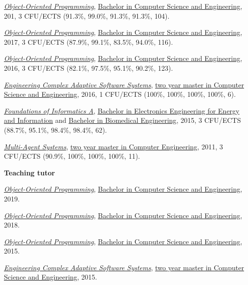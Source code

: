 \begin{outerlist}
\begin{innerlist}
      \item \href{http://archive.fo/srdtN}{\textit{Object-Oriented Programming}}, \href{http://archive.fo/UM5wl}{Bachelor in Computer Science and Engineering}, 201, 3 CFU/ECTS (91.3\%, 99.0\%, 91.3\%, 91.3\%, 104).
      \item \href{http://archive.fo/54lT9}{\textit{Object-Oriented Programming}}, \href{http://archive.fo/UM5wl}{Bachelor in Computer Science and Engineering}, 2017, 3 CFU/ECTS (87.9\%, 99.1\%, 83.5\%, 94.0\%, 116).
      \item \href{http://archive.fo/0XLbd}{\textit{Object-Oriented Programming}}, \href{http://archive.fo/UM5wl}{Bachelor in Computer Science and Engineering}, 2016, 3 CFU/ECTS (82.1\%, 97.5\%, 95.1\%, 90.2\%, 123).
      \item \href{http://archive.fo/1eIMt}{\textit{Engineering Complex Adaptive Software Systems}}, \href{http://archive.fo/toz5c}{two year master in Computer Science and Engineering}, 2016, 1 CFU/ECTS (100\%, 100\%, 100\%, 100\%, 6).
      \item \href{http://archive.fo/JrWEu/}{\textit{Foundations of Informatics A}}, \href{http://archive.fo/30rN0}{Bachelor in Electronics Engineering for Energy and Information} and \href{http://archive.fo/jW52L}{Bachelor in Biomedical Engineering}, 2015, 3 CFU/ECTS (88.7\%, 95.1\%, 98.4\%, 98.4\%, 62).
      \item \href{http://archive.fo/nnsBl/}{\textit{Multi-Agent Systems}}, \href{http://archive.fo/qDVq3}{two year master in Computer Engineering}, 2011, 3 CFU/ECTS (90.9\%, 100\%, 100\%, 100\%, 11).
    \end{innerlist}
\item[] \textbf{Teaching tutor} %
    \begin{innerlist}
      \item \href{http://archive.fo/JtEDW}{\textit{Object-Oriented Programming}}, \href{http://archive.fo/UM5wl}{Bachelor in Computer Science and Engineering}, 2019.
      \item \href{http://archive.fo/srdtN}{\textit{Object-Oriented Programming}}, \href{http://archive.fo/UM5wl}{Bachelor in Computer Science and Engineering}, 2018.
      \item \href{http://archive.fo/puTDG}{\textit{Object-Oriented Programming}}, \href{http://archive.fo/UM5wl}{Bachelor in Computer Science and Engineering}, 2015.
      \item \href{http://archive.fo/5LhhW}{\textit{Engineering Complex Adaptive Software Systems}}, \href{http://archive.fo/toz5c}{two year master in Computer Science and Engineering}, 2015.

\end{innerlist}
\end{outerlist}
